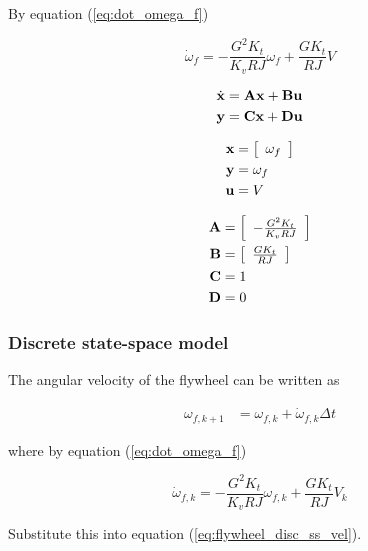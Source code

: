 By equation (\ref{eq:dot_omega_f})

\begin{equation*}
  \dot{\omega}_f = -\frac{G^2 K_t}{K_v RJ} \omega_f + \frac{G K_t}{RJ} V
\end{equation*}

\begin{align*}
  \dot{\mathbf{x}} &= \mathbf{A} \mathbf{x} + \mathbf{B} \mathbf{u} \\
  \mathbf{y} &= \mathbf{C} \mathbf{x} + \mathbf{D} \mathbf{u}
\end{align*}

\begin{align*}
  \mathbf{x} &= \left[
  \begin{array}{c}
    \omega_f
  \end{array}
  \right] \\
  \mathbf{y} &= \omega_f \\
  \mathbf{u} &= V
\end{align*}

\begin{align}
  \mathbf{A} &= \left[
  \begin{array}{c}
    -\frac{G^2 K_t}{K_v RJ}
  \end{array}
  \right] \\
  \mathbf{B} &= \left[
  \begin{array}{c}
    \frac{G K_t}{RJ}
  \end{array}
  \right] \\
  \mathbf{C} &= 1 \\
  \mathbf{D} &= 0
\end{align}

\subsubsection{Discrete state-space model}

The angular velocity of the flywheel can be written as

\begin{align}
  \omega_{f,k+1} &= \omega_{f,k} + \dot{\omega}_{f,k} \Delta t
    \label{eq:flywheel_disc_ss_vel}
\end{align}

where by equation (\ref{eq:dot_omega_f})

\begin{equation*}
  \dot{\omega}_{f,k} = -\frac{G^2 K_t}{K_v RJ} \omega_{f,k} +
    \frac{G K_t}{RJ} V_k
\end{equation*}

Substitute this into equation (\ref{eq:flywheel_disc_ss_vel}).

